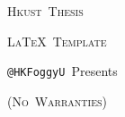 \begin{center}

{\fontsize{38pt}{38pt}\selectfont\textsc{Hkust~Thesis}}
\vspace{6pt}

{\fontsize{25}{25}\selectfont\textsc{\LaTeX~Template}}
\vspace{4pt}

{\fontsize{12}{12}\selectfont\texttt{@HKFoggyU}~\textrm{Presents}}
\vspace{2pt}

{\fontsize{9}{9}\selectfont\textsc{(No~Warranties)}}

\end{center}
